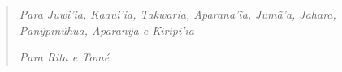 \begin{quote}
\emph{Para Juwi'ia, Kaaui'ia, Takwaria, Aparana'ĩa, Jumã'a, Jahara,
Panỹpinũhua, Aparanỹa e Kiripi'ia}

\emph{Para Rita e Tomé}
\end{quote}
